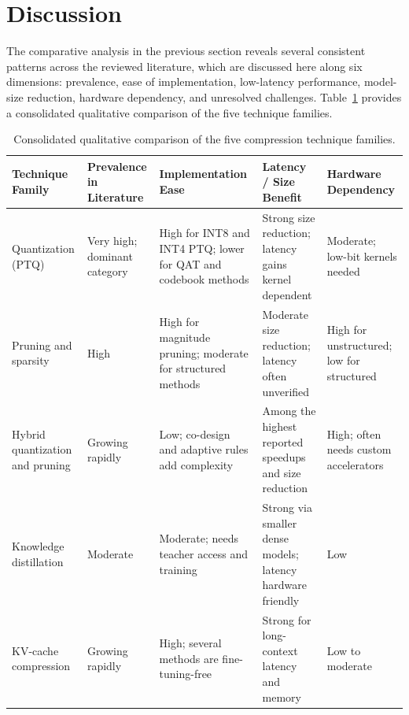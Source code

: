 \section{Discussion}
\label{sec:lr-discussion}

The comparative analysis in the previous section reveals several consistent patterns across the reviewed literature, which are discussed here along six dimensions: prevalence, ease of implementation, low-latency performance, model-size reduction, hardware dependency, and unresolved challenges. Table~\ref{tab:lr-families} provides a consolidated qualitative comparison of the five technique families.

\begin{table}[htbp]
\centering
\scriptsize
\caption{Consolidated qualitative comparison of the five compression technique families.}
\label{tab:lr-families}
\renewcommand{\arraystretch}{1.2}
\begin{tabular}{p{}p{}p{}p{}p{}}
\hline
\textbf{Technique Family} & \textbf{Prevalence in Literature} & \textbf{Implementation Ease} & \textbf{Latency / Size Benefit} & \textbf{Hardware Dependency} \\
\hline
Quantization (PTQ) & Very high; dominant category & High for INT8 and INT4 PTQ; lower for QAT and codebook methods & Strong size reduction; latency gains kernel dependent & Moderate; low-bit kernels needed \\
Pruning and sparsity & High & High for magnitude pruning; moderate for structured methods & Moderate size reduction; latency often unverified & High for unstructured; low for structured \\
Hybrid quantization and pruning & Growing rapidly & Low; co-design and adaptive rules add complexity & Among the highest reported speedups and size reduction & High; often needs custom accelerators \\
Knowledge distillation & Moderate & Moderate; needs teacher access and training & Strong via smaller dense models; latency hardware friendly & Low \\
KV-cache compression & Growing rapidly & High; several methods are fine-tuning-free & Strong for long-context latency and memory & Low to moderate \\
\hline
\end{tabular}
\end{table}


